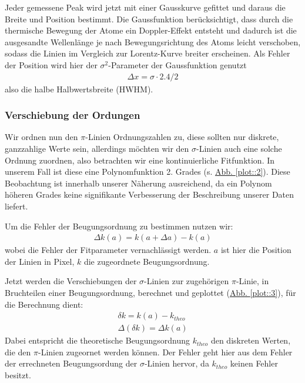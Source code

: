         Jeder gemessene Peak wird jetzt mit einer Gausskurve gefittet und daraus die Breite und Position bestimmt. Die Gaussfunktion berücksichtigt, dass durch die thermische Bewegung der Atome ein Doppler-Effekt entsteht und dadurch ist die ausgesandte Wellenlänge je nach Bewegungsrichtung des Atoms leicht verschoben, sodass die Linien im Vergleich zur Lorentz-Kurve breiter erscheinen. Als Fehler der Position wird hier der $\sigma^2$-Parameter der Gaussfunktion genutzt
        \begin{align}
          \Delta x = \sigma \cdot 2.4 / 2
        \end{align}
        also die halbe Halbwertsbreite (HWHM).

      \subsubsection{Verschiebung der Ordungen}
        Wir ordnen nun den $\pi$-Linien Ordnungszahlen zu, diese sollten nur diskrete, ganzzahlige Werte sein, allerdings möchten wir den $\sigma$-Linien auch eine solche Ordnung zuordnen, also betrachten wir eine kontinuierliche Fitfunktion. In unserem Fall ist diese eine Polynomfunktion 2. Grades (s. \hyperref[plot::2]{Abb. \ref*{plot::2}}). Diese Beobachtung ist innerhalb unserer Näherung ausreichend, da ein Polynom höheren Grades keine signifikante Verbesserung der Beschreibung unserer Daten liefert.

        Um die Fehler der Beugungsordnung zu bestimmen nutzen wir:
        \begin{align}
          \Delta k(a) = k(a+\Delta a) - k(a)
        \end{align}
        wobei die Fehler der Fitparameter vernachlässigt werden. $a$ ist hier die Position der Linien in Pixel, $k$ die zugeordnete Beugungsordnung.

        Jetzt werden die Verschiebungen der $\sigma$-Linien zur zugehörigen $\pi$-Linie, in Bruchteilen einer Beugungsordnung, berechnet und geplottet (\hyperref[plot::3]{Abb. \ref*{plot::3}}), für die Berechnung dient:
        \begin{align}
          \delta k = k(a) - k_{theo}\\
          \Delta (\delta k) = \Delta k(a)
        \end{align}
        Dabei entspricht die theoretische Beugungsordnung $k_{theo}$ den diskreten Werten, die den $\pi$-Linien zugeornet werden können. Der Fehler geht hier aus dem Fehler der errechneten Beugungsordung der $\sigma$-Linien hervor, da $k_{theo}$ keinen Fehler besitzt.


